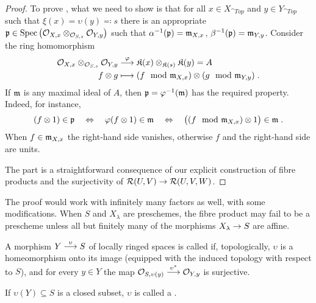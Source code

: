 \documentclass[a4paper,parskip=half,numbers=enddot, DIV=12]{scrreprt}
\begin{document}
\begin{proof}
    To prove , what we need to show is that for all $x\in X_{\cat{Top}}$ and $y\in Y_{\cat{Top}}$ such that $\xi(x) = \upsilon(y)\eqqcolon s$ there is an appropriate $\mathfrak{p}\in \operatorname{Spec}\left(\mathcal{O}_{X,x} \otimes_{\mathcal{O}_{S,s}}\mathcal{O}_{Y,y}\right)$ such that $\alpha^{-1}(\mathfrak{p}) = \mathfrak{m}_{X,x}$, $\beta^{-1}(\mathfrak{p}) = \mathfrak{m}_{Y,y}$. Consider the ring homomorphism
    \begin{align*}
        \Oo_{X,x}\otimes_{\Oo_{S,s}} \Oo_{Y,y} &\morphism[\phi] \KK(x) \otimes_{\KK(s)}\KK(y) = A\\
        f\otimes g &\longmapsto (f\mod \mm_{X,x}) \otimes (g\mod \mm_{Y,y})\;.
    \end{align*}
    If $\mathfrak{m}$ is any maximal ideal of $A$, then $\mathfrak{p} = \varphi^{-1}(\mathfrak{m})$ has the required property. Indeed, for instance,
    \begin{align*}
        (f\otimes 1)\in\mathfrak{p} \quad\Leftrightarrow\quad \varphi(f\otimes 1)\in \mathfrak{m} \quad\Leftrightarrow\quad \big((f\mod{\mathfrak{m}}_{X,x})\otimes 1\big) \in\mathfrak{m}\;.
    \end{align*}
    When $f\in \mathfrak{m}_{X,x}$ the right-hand side vanishes, otherwise $f$ and the right-hand side are units.
    
    The part  is a straightforward consequence of our explicit construction of fibre products and the surjectivity of $\Rr(U,V) \morphism \Rr(U,V,W)$.
\end{proof}

\begin{rem}
    The proof would work with infinitely many factors as well, with some modifications. When $S$ and $X_\lambda$ are preschemes, the fibre product may fail to be a prescheme unless all but finitely many of the morphisms $X_\lambda \morphism S$ are affine.
\end{rem}

\begin{defi} 
    A morphism $Y\morphism[\upsilon] S$ of locally ringed spaces is called  if, topologically, $\upsilon$ is a homeomorphism onto its image (equipped with the induced topology with respect to $S$), and for every $y\in Y$ the map $\Oo_{S,\upsilon(y)} \morphism[\upsilon^*]\Oo_{Y,y}$ is surjective. 
       
    If $\upsilon(Y)\subseteq S$ is a closed subset, $\upsilon$ is called a .
\end{defi}
\end{document}
